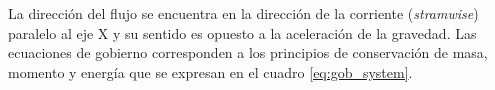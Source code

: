 \begin{figure}[H]
 \centering
 \caption{} 
 \label{fig:sistem_domain}
\end{figure}


La dirección del flujo se encuentra en la dirección de la corriente (\textit{stramwise}) paralelo al eje X y su sentido es opuesto a la aceleración de la gravedad. Las ecuaciones de gobierno corresponden a los principios de conservación de masa, momento y energía que se expresan en el cuadro \ref{eq:gob_system}.

